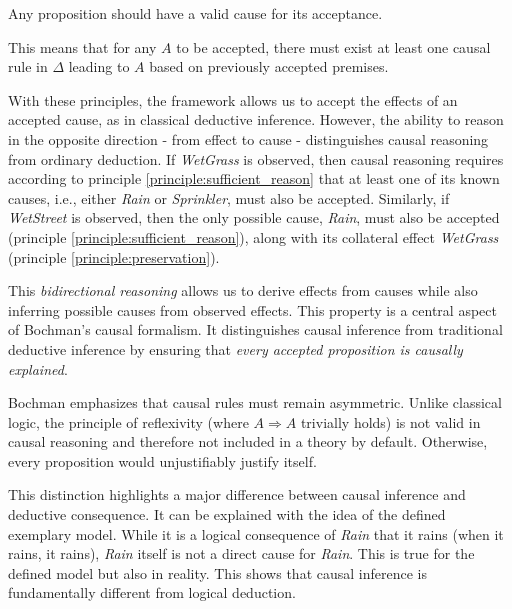 \documentclass[seminar,palatino,english]{AIGpaper}
\begin{document}
\begin{principle}\label{principle:sufficient_reason}
Any proposition should have a valid cause for its acceptance. 
\end{principle}

This means that for any $ A $ to be accepted, there must exist at least one causal rule in $ \Delta $ leading to $ A $ based on previously accepted premises.



With these principles, the framework allows us to accept the effects of an accepted cause,  as in classical deductive inference. However, the ability to reason in the opposite direction - from effect to cause - distinguishes causal reasoning from ordinary deduction. If \textit{WetGrass} is observed, then causal reasoning requires according to principle \ref{principle:sufficient_reason} that at least one of its known causes, i.e., either \textit{Rain} or \textit{Sprinkler}, must also be accepted. Similarly, if \textit{WetStreet} is observed, then the only possible cause, \textit{Rain}, must also be accepted (principle \ref{principle:sufficient_reason}), along with its collateral effect \textit{WetGrass} (principle \ref{principle:preservation}). 

This \emph{bidirectional reasoning} allows us to derive  effects from causes while also inferring possible causes from observed effects. This property is a central aspect of Bochman’s causal formalism. It distinguishes causal inference from traditional deductive inference by ensuring that \emph{every accepted proposition is causally explained}. 

Bochman emphasizes that causal rules must remain asymmetric. Unlike classical logic, the principle of reflexivity (where $ A \Rightarrow A $ trivially holds) is not valid in causal reasoning and therefore not included in a theory by default. Otherwise, every proposition would unjustifiably justify itself. 

This distinction highlights a major difference between causal inference and deductive consequence. It can be explained with the idea of the defined exemplary model. While it is a logical consequence of \textit{Rain} that it rains (\glqq{}when it rains, it rains\grqq{}), \textit{Rain} itself is not a direct cause for \textit{Rain}. This is true for the defined model but also in reality. This shows that causal inference is fundamentally different from logical deduction.
\end{document}
